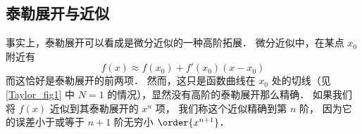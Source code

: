 \subsection{泰勒展开与近似}
事实上，泰勒展开可以看成是微分近似的一种高阶拓展． 微分近似中，在某点 $x_0$ 附近有
\begin{equation}
f(x) \approx f(x_0) + f'(x_0)(x - x_0)
\end{equation}
而这恰好是泰勒展开的前两项． 然而，这只是函数曲线在 $x_0$ 处的切线（见\autoref{Taylor_fig1} 中 $N=1$ 的情况），显然没有高阶的泰勒展开那么精确． 如果我们将 $f(x)$ 近似到其泰勒展开的 $x^n$ 项， 我们称这个近似精确到第 $n$ 阶， 因为它的误差小于或等于 $n + 1$ 阶无穷小 $\order{x^{n + 1}}$．
